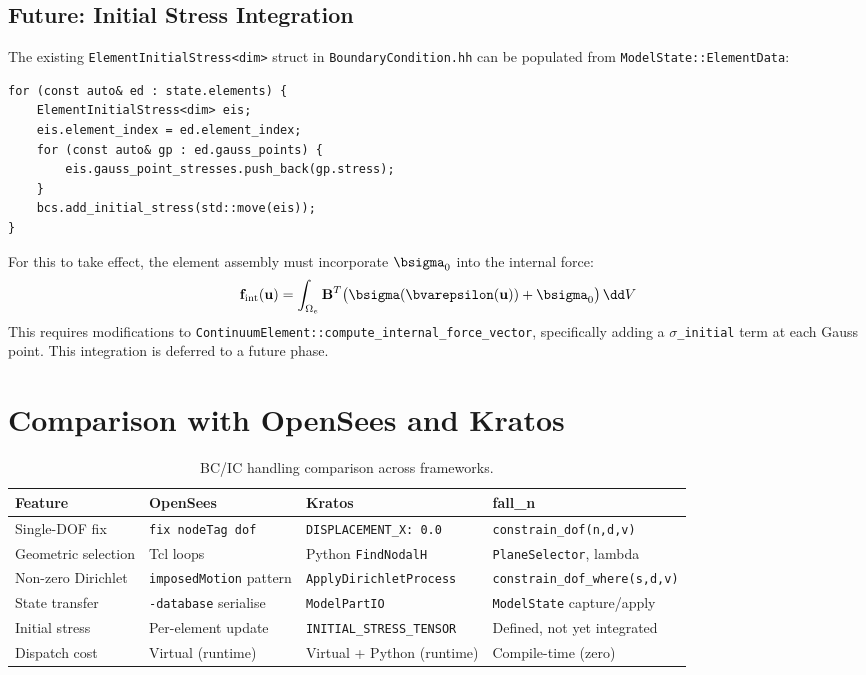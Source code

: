 \subsection{Future: Initial Stress Integration}

The existing \texttt{ElementInitialStress<dim>} struct in
\texttt{BoundaryCondition.hh} can be populated from
\texttt{ModelState::ElementData}:

\begin{lstlisting}
for (const auto& ed : state.elements) {
    ElementInitialStress<dim> eis;
    eis.element_index = ed.element_index;
    for (const auto& gp : ed.gauss_points) {
        eis.gauss_point_stresses.push_back(gp.stress);
    }
    bcs.add_initial_stress(std::move(eis));
}
\end{lstlisting}

\noindent
For this to take effect, the element assembly must incorporate
$\bsigma_0$ into the internal force:
\[
  \mathbf{f}_{\text{int}}(\mathbf{u})
  = \int_{\Omega_e} \mathbf{B}^T \bigl(\bsigma(\bvarepsilon(\mathbf{u}))
      + \bsigma_0\bigr)\,\dd V
\]
This requires modifications to \texttt{ContinuumElement::compute\_internal\-\_force\_vector},
specifically adding a \texttt{$\sigma$\_initial} term at each Gauss point.
This integration is deferred to a future phase.


\section{Comparison with OpenSees and Kratos}
\label{sec:bc-comparison}

\begin{table}[ht]
\centering\small
\caption{BC/IC handling comparison across frameworks.}
\label{tab:bc-framework}
\begin{tabular}{p{3cm}p{3.5cm}p{3.5cm}p{3.5cm}}
\toprule
\textbf{Feature} & \textbf{OpenSees} & \textbf{Kratos} & \textbf{fall\_n} \\
\midrule
Single-DOF fix
  & \texttt{fix nodeTag dof}
  & \texttt{DISPLACEMENT\_X: 0.0}
  & \texttt{constrain\_dof(n,d,v)} \\
Geometric selection
  & Tcl loops
  & Python \texttt{FindNodalH}
  & \texttt{PlaneSelector}, lambda \\
Non-zero Dirichlet
  & \texttt{imposedMotion} pattern
  & \texttt{ApplyDirichlet\-Process}
  & \texttt{constrain\_dof\_where(s,d,v)} \\
State transfer
  & \texttt{-database} serialise
  & \texttt{ModelPartIO}
  & \texttt{ModelState} capture/apply \\
Initial stress
  & Per-element update
  & \texttt{INITIAL\_STRESS\_TENSOR}
  & Defined, not yet integrated \\
Dispatch cost
  & Virtual (runtime)
  & Virtual + Python (runtime)
  & Compile-time (zero) \\
\bottomrule
\end{tabular}
\end{table}

